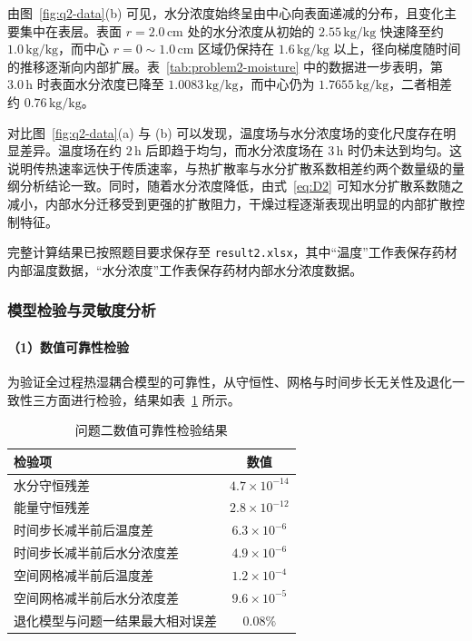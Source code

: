 \documentclass[12pt,a4paper]{article}
\begin{document}
由图~\ref{fig:q2-data}(b) 可见，水分浓度始终呈由中心向表面递减的分布，且变化主要集中在表层。表面 \(r=2.0\,\mathrm{cm}\) 处的水分浓度从初始的 \(2.55\,\mathrm{kg/kg}\) 快速降至约 \(1.0\,\mathrm{kg/kg}\)，而中心 \(r=0\sim 1.0\,\mathrm{cm}\) 区域仍保持在 \(1.6\,\mathrm{kg/kg}\) 以上，径向梯度随时间的推移逐渐向内部扩展。表~\ref{tab:problem2-moisture} 中的数据进一步表明，第 \(3.0\,\mathrm{h}\) 时表面水分浓度已降至 \(1.0083\,\mathrm{kg/kg}\)，而中心仍为 \(1.7655\,\mathrm{kg/kg}\)，二者相差约 \(0.76\,\mathrm{kg/kg}\)。

对比图~\ref{fig:q2-data}(a) 与 (b) 可以发现，温度场与水分浓度场的变化尺度存在明显差异。温度场在约 \(2\,\mathrm{h}\) 后即趋于均匀，而水分浓度场在 \(3\,\mathrm{h}\) 时仍未达到均匀。这说明传热速率远快于传质速率，与热扩散率与水分扩散系数相差约两个数量级的量纲分析结论一致。同时，随着水分浓度降低，由式~\eqref{eq:D2} 可知水分扩散系数随之减小，内部水分迁移受到更强的扩散阻力，干燥过程逐渐表现出明显的内部扩散控制特征。

完整计算结果已按照题目要求保存至 \texttt{result2.xlsx}，其中“温度”工作表保存药材内部温度数据，“水分浓度”工作表保存药材内部水分浓度数据。

\subsubsection{模型检验与灵敏度分析}

\paragraph{（1）数值可靠性检验}

为验证全过程热湿耦合模型的可靠性，从守恒性、网格与时间步长无关性及退化一致性三方面进行检验，结果如表~\ref{tab:verification2} 所示。

\begin{table}[htbp]
\centering
\caption{问题二数值可靠性检验结果}
\label{tab:verification2}
\renewcommand{\arraystretch}{1.15}
\begin{tabular}{lc}
\toprule
检验项 & 数值 \\
\midrule
水分守恒残差 & \(4.7\times10^{-14}\) \\
能量守恒残差 & \(2.8\times10^{-12}\) \\
时间步长减半前后温度差 & \(6.3\times10^{-6}\) \\
时间步长减半前后水分浓度差 & \(4.9\times10^{-6}\) \\
空间网格减半前后温度差 & \(1.2\times10^{-4}\) \\
空间网格减半前后水分浓度差 & \(9.6\times10^{-5}\) \\
退化模型与问题一结果最大相对误差 & \(0.08\%\) \\
\bottomrule
\end{tabular}
\end{table}
\end{document}
